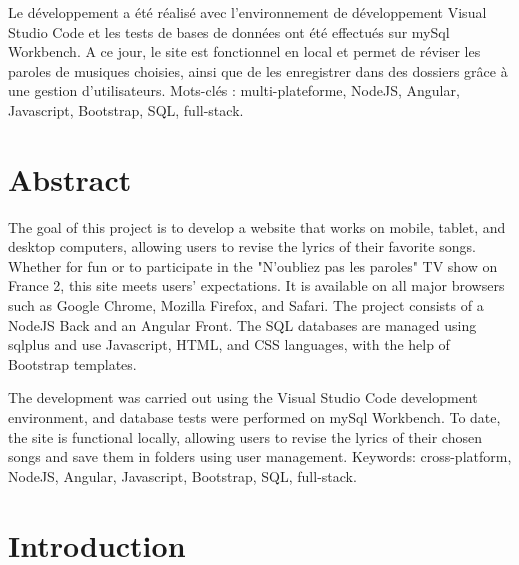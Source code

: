 \documentclass[12pt,french]{article}
\begin{document}
Le développement a été réalisé avec l'environnement de développement Visual Studio Code et les tests de bases de données ont été effectués sur mySql Workbench. A ce jour, le site est fonctionnel en local et permet de réviser les paroles de musiques choisies, ainsi que de les enregistrer dans des dossiers grâce à une gestion d'utilisateurs.
\newline 
\newline
Mots-clés : multi-plateforme, NodeJS, Angular, \gls{Javascript}, Bootstrap, SQL, full-stack.

\section*{Abstract}

The goal of this project is to develop a website that works on mobile, tablet, and desktop computers, allowing users to revise the lyrics of their favorite songs. Whether for fun or to participate in the "N'oubliez pas les paroles" TV show on France 2, this site meets users' expectations. It is available on all major browsers such as Google Chrome, Mozilla Firefox, and Safari. The project consists of a NodeJS \gls{Back} and an Angular \gls{Front}. The \gls{SQL} databases are managed using sqlplus and use \gls{Javascript}, \gls{HTML}, and \gls{CSS} languages, with the help of Bootstrap templates.
\newline 

The development was carried out using the Visual Studio Code development environment, and database tests were performed on mySql Workbench. To date, the site is functional locally, allowing users to revise the lyrics of their chosen songs and save them in folders using user management.
\newline 
\newline 
Keywords: cross-platform, NodeJS, Angular, \gls{Javascript}, Bootstrap, \gls{SQL}, full-stack.

\newpage


\renewcommand{\contentsname}{Table des matières}
\normalsize\tableofcontents %

\newpage

\vspace*{0.01cm}

\section*{Introduction}
\end{document}
